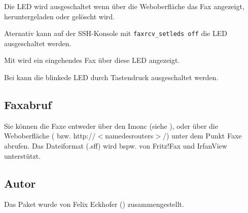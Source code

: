     Die LED wird ausgeschaltet wenn über die Weboberfläche das Fax angezeigt, 
    heruntergeladen oder gelöscht wird.
    
    Aternativ kann auf der SSH-Konsole mit \texttt{faxrcv\_setleds off} die LED
    ausgeschaltet werden.

\begin{description}

    Mit  wird ein eingehendes Fax über diese 
    LED angezeigt.
    
    Bei  kann die blinkede LED 
    durch Tastendruck ausgeschaltet werden.

\end{description}

\subsection {Faxabruf }

    Sie können die Faxe entweder über den Imonc (siehe ),
    oder über die Weboberfläche ( bzw. 
    http://$<$namedesrouters$>$/) unter dem Punkt \dq{}Faxe\dq{}
    abrufen. Das Dateiformat (.sff) wird bspw. von Fritz!Fax und IrfanView
    unterstützt.
 
\subsection {Autor }

    Das Paket wurde von Felix Eckhofer () zusammengestellt.
